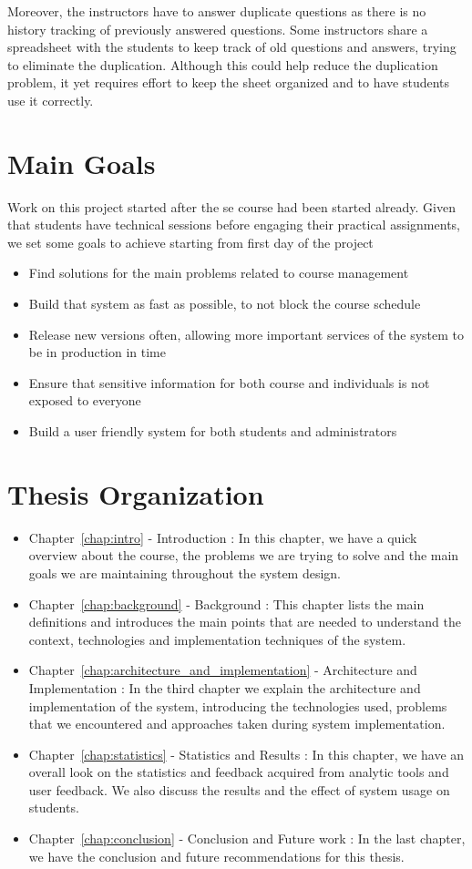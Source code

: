 \newParagraph
Moreover, the instructors have to answer duplicate questions as there is no history tracking of previously answered questions. Some instructors share
a spreadsheet with the students to keep track of old questions and answers, trying to eliminate the duplication. Although this could help reduce the duplication
problem, it yet requires effort to keep the sheet organized and to have students use it correctly.

\section{Main Goals}
\label{sec:main-goals}
Work on this project started after the \ac{se} course had been started already. Given that students have technical sessions before
engaging their practical assignments, we set some goals to achieve starting from first day of the project
\begin{itemize}
  \item Find solutions for the main problems related to course management
  \item Build that system as fast as possible, to not block the course schedule
  \item Release new versions often, allowing more important services of the system to be in production in time
  \item Ensure that sensitive information for both course and individuals is not exposed to everyone
  \item Build a user friendly system for both students and administrators
\end{itemize}

\section{Thesis Organization}
\label{sec:thesis-organization}
\begin{itemize}
  \item Chapter~\ref{chap:intro} - Introduction : In this chapter, we have a quick overview about the course, the problems
  we are trying to solve and the main goals we are maintaining throughout the system design.
  \item Chapter~\ref{chap:background} - Background : This chapter lists the main definitions and introduces the main points that
  are needed to understand the context, technologies and implementation techniques of the system.
  \item Chapter~\ref{chap:architecture_and_implementation} - Architecture and Implementation : In the third chapter we explain the architecture
  and implementation of the system, introducing the technologies used, problems that we encountered and approaches taken during system implementation.
  \item Chapter~\ref{chap:statistics} - Statistics and Results : In this chapter, we have an overall look on the statistics and feedback
  acquired from analytic tools and user feedback. We also discuss the results and the effect of system usage on students.
  \item Chapter~\ref{chap:conclusion} - Conclusion and Future work : In the last chapter, we have the conclusion and future recommendations for this
  thesis.
\end{itemize}
